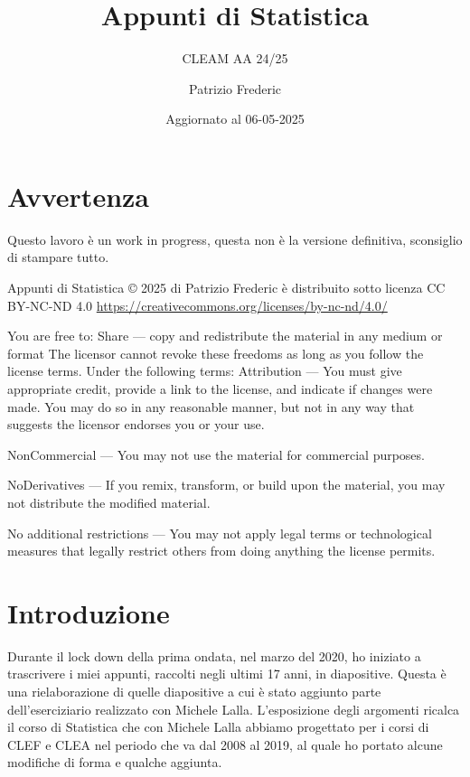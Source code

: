 \documentclass[
  11pt,
]{book}
\title{Appunti di Statistica}
\subtitle{CLEAM AA 24/25}
\author{Patrizio Frederic}
\date{Aggiornato al 06-05-2025}
\theoremstyle{mytheoremstyle}
\theoremstyle{mydefstyle}
\begin{document}
\maketitle

{
\setcounter{tocdepth}{2}
\tableofcontents
}
\chapter*{Avvertenza}\label{avvertenza}

\large

Questo lavoro è un work in progress, questa non è la versione definitiva, sconsiglio di stampare tutto.

\normalsize

Appunti di Statistica © 2025 di Patrizio Frederic è distribuito
sotto licenza CC BY-NC-ND 4.0
\url{https://creativecommons.org/licenses/by-nc-nd/4.0/}

You are free to:
Share --- copy and redistribute the material in any medium or format
The licensor cannot revoke these freedoms as long as you follow the license terms.
Under the following terms:
Attribution --- You must give appropriate credit, provide a link to the license, and indicate if changes were made. You may do so in any reasonable manner, but not in any way that suggests the licensor endorses you or your use.

NonCommercial --- You may not use the material for commercial purposes.

NoDerivatives --- If you remix, transform, or build upon the material, you may not distribute the modified material.

No additional restrictions --- You may not apply legal terms or technological measures that legally restrict others from doing anything the license permits.

\chapter*{Introduzione}\label{introduzione}

Durante il lock down della prima ondata, nel marzo del 2020, ho iniziato a trascrivere
i miei appunti, raccolti negli ultimi 17 anni, in diapositive. Questa è una rielaborazione
di quelle diapositive a cui è stato aggiunto parte dell'eserciziario realizzato con Michele Lalla.
L'esposizione degli argomenti ricalca il corso di Statistica che con Michele Lalla abbiamo
progettato per i corsi di CLEF e CLEA nel periodo che va dal 2008 al 2019, al quale ho
portato alcune modifiche di forma e qualche aggiunta.
\end{document}
